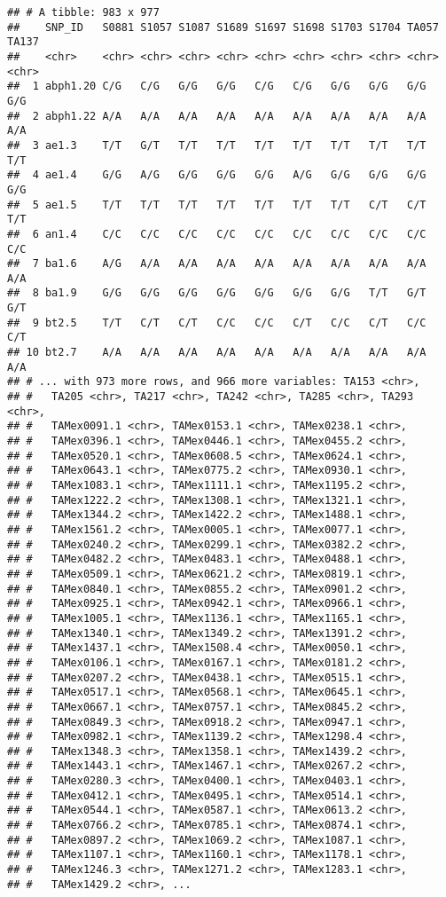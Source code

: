 \documentclass[]{article}
\begin{document}
\begin{verbatim}
## # A tibble: 983 x 977
##    SNP_ID   S0881 S1057 S1087 S1689 S1697 S1698 S1703 S1704 TA057 TA137
##    <chr>    <chr> <chr> <chr> <chr> <chr> <chr> <chr> <chr> <chr> <chr>
##  1 abph1.20 C/G   C/G   G/G   G/G   C/G   C/G   G/G   G/G   G/G   G/G  
##  2 abph1.22 A/A   A/A   A/A   A/A   A/A   A/A   A/A   A/A   A/A   A/A  
##  3 ae1.3    T/T   G/T   T/T   T/T   T/T   T/T   T/T   T/T   T/T   T/T  
##  4 ae1.4    G/G   A/G   G/G   G/G   G/G   A/G   G/G   G/G   G/G   G/G  
##  5 ae1.5    T/T   T/T   T/T   T/T   T/T   T/T   T/T   C/T   C/T   T/T  
##  6 an1.4    C/C   C/C   C/C   C/C   C/C   C/C   C/C   C/C   C/C   C/C  
##  7 ba1.6    A/G   A/A   A/A   A/A   A/A   A/A   A/A   A/A   A/A   A/A  
##  8 ba1.9    G/G   G/G   G/G   G/G   G/G   G/G   G/G   T/T   G/T   G/T  
##  9 bt2.5    T/T   C/T   C/T   C/C   C/C   C/T   C/C   C/T   C/C   C/T  
## 10 bt2.7    A/A   A/A   A/A   A/A   A/A   A/A   A/A   A/A   A/A   A/A  
## # ... with 973 more rows, and 966 more variables: TA153 <chr>,
## #   TA205 <chr>, TA217 <chr>, TA242 <chr>, TA285 <chr>, TA293 <chr>,
## #   TAMex0091.1 <chr>, TAMex0153.1 <chr>, TAMex0238.1 <chr>,
## #   TAMex0396.1 <chr>, TAMex0446.1 <chr>, TAMex0455.2 <chr>,
## #   TAMex0520.1 <chr>, TAMex0608.5 <chr>, TAMex0624.1 <chr>,
## #   TAMex0643.1 <chr>, TAMex0775.2 <chr>, TAMex0930.1 <chr>,
## #   TAMex1083.1 <chr>, TAMex1111.1 <chr>, TAMex1195.2 <chr>,
## #   TAMex1222.2 <chr>, TAMex1308.1 <chr>, TAMex1321.1 <chr>,
## #   TAMex1344.2 <chr>, TAMex1422.2 <chr>, TAMex1488.1 <chr>,
## #   TAMex1561.2 <chr>, TAMex0005.1 <chr>, TAMex0077.1 <chr>,
## #   TAMex0240.2 <chr>, TAMex0299.1 <chr>, TAMex0382.2 <chr>,
## #   TAMex0482.2 <chr>, TAMex0483.1 <chr>, TAMex0488.1 <chr>,
## #   TAMex0509.1 <chr>, TAMex0621.2 <chr>, TAMex0819.1 <chr>,
## #   TAMex0840.1 <chr>, TAMex0855.2 <chr>, TAMex0901.2 <chr>,
## #   TAMex0925.1 <chr>, TAMex0942.1 <chr>, TAMex0966.1 <chr>,
## #   TAMex1005.1 <chr>, TAMex1136.1 <chr>, TAMex1165.1 <chr>,
## #   TAMex1340.1 <chr>, TAMex1349.2 <chr>, TAMex1391.2 <chr>,
## #   TAMex1437.1 <chr>, TAMex1508.4 <chr>, TAMex0050.1 <chr>,
## #   TAMex0106.1 <chr>, TAMex0167.1 <chr>, TAMex0181.2 <chr>,
## #   TAMex0207.2 <chr>, TAMex0438.1 <chr>, TAMex0515.1 <chr>,
## #   TAMex0517.1 <chr>, TAMex0568.1 <chr>, TAMex0645.1 <chr>,
## #   TAMex0667.1 <chr>, TAMex0757.1 <chr>, TAMex0845.2 <chr>,
## #   TAMex0849.3 <chr>, TAMex0918.2 <chr>, TAMex0947.1 <chr>,
## #   TAMex0982.1 <chr>, TAMex1139.2 <chr>, TAMex1298.4 <chr>,
## #   TAMex1348.3 <chr>, TAMex1358.1 <chr>, TAMex1439.2 <chr>,
## #   TAMex1443.1 <chr>, TAMex1467.1 <chr>, TAMex0267.2 <chr>,
## #   TAMex0280.3 <chr>, TAMex0400.1 <chr>, TAMex0403.1 <chr>,
## #   TAMex0412.1 <chr>, TAMex0495.1 <chr>, TAMex0514.1 <chr>,
## #   TAMex0544.1 <chr>, TAMex0587.1 <chr>, TAMex0613.2 <chr>,
## #   TAMex0766.2 <chr>, TAMex0785.1 <chr>, TAMex0874.1 <chr>,
## #   TAMex0897.2 <chr>, TAMex1069.2 <chr>, TAMex1087.1 <chr>,
## #   TAMex1107.1 <chr>, TAMex1160.1 <chr>, TAMex1178.1 <chr>,
## #   TAMex1246.3 <chr>, TAMex1271.2 <chr>, TAMex1283.1 <chr>,
## #   TAMex1429.2 <chr>, ...
\end{verbatim}
\end{document}
